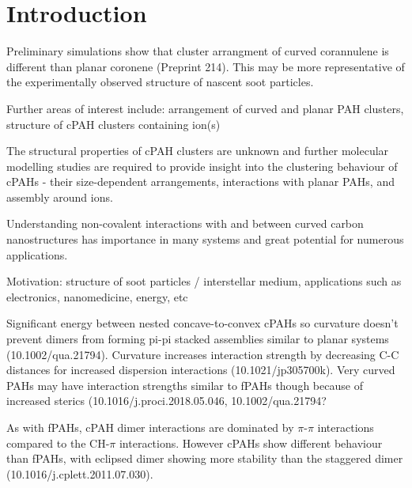 \newcommand{\curPAHAP}{curPAHIP\xspace} 
%
\section{Introduction}
\label{sec:Introduction}
% 




Preliminary simulations show that cluster arrangment of curved corannulene is different than planar coronene (Preprint 214). This may be more representative of the experimentally observed structure of nascent soot particles.

Further areas of interest include: arrangement of curved and planar PAH clusters, structure of cPAH clusters containing ion(s)

The structural properties of cPAH clusters are unknown and further molecular modelling studies are required to provide insight into the clustering behaviour of cPAHs - their size-dependent arrangements, interactions with planar PAHs, and assembly around ions.

Understanding non-covalent interactions with and between curved carbon nanostructures has importance in many systems and great potential for numerous applications.

Motivation: structure of soot particles / interstellar medium, applications such as electronics, nanomedicine, energy, etc



Significant energy between nested concave-to-convex cPAHs so curvature doesn’t prevent dimers from forming pi-pi stacked assemblies similar to planar systems (10.1002/qua.21794). Curvature increases interaction strength by decreasing C-C distances for increased dispersion interactions (10.1021/jp305700k). Very curved PAHs may have interaction strengths similar to fPAHs though because of increased sterics (10.1016/j.proci.2018.05.046, 10.1002/qua.21794?

As with fPAHs, cPAH dimer interactions are dominated by $\pi$-$\pi$ interactions compared to the CH-$\pi$ interactions. However cPAHs show different behaviour than fPAHs, with eclipsed dimer showing more stability than the staggered dimer (10.1016/j.cplett.2011.07.030).



